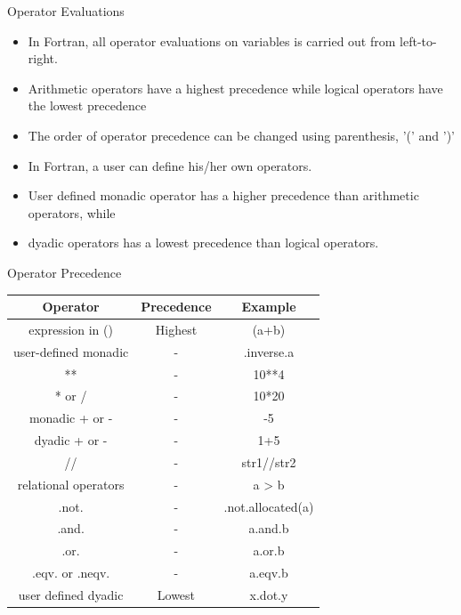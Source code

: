 \documentclass[c,mathserif,compress,xcolor=svgnames]{beamer}
\begin{document}
\begin{frame}[allowframebreaks]{Operator Evaluations}
  \begin{itemize}
    \item In Fortran, all operator evaluations on variables is carried out from left-to-right.
    \item Arithmetic operators have a highest precedence while logical operators have the lowest precedence
    \item The order of operator precedence can be changed using parenthesis, '(' and ')'
    \item In Fortran, a user can define his/her own operators.
    \item User defined monadic operator has a higher precedence than arithmetic operators, while
    \item dyadic operators has a lowest precedence than logical operators.
  \end{itemize}
  \begin{block}{{\scriptsize Operator Precedence}}
    \begin{center}
      {
      \begin{tabular}{ccc}
        Operator & Precedence & Example \\
        \hline
        expression in () & Highest & (a+b) \\
        user-defined monadic & - & .inverse.a \\
        ** & - & 10**4 \\
        * or / & - & 10*20 \\
        monadic + or - & - & -5 \\
        dyadic + or - & - & 1+5 \\
        // & - & str1//str2 \\
        relational operators & - & a > b \\
        .not. & - & .not.allocated(a) \\
        .and. & - & a.and.b \\
        .or. & - & a.or.b \\
        .eqv. or .neqv. & - & a.eqv.b \\
        user defined dyadic & Lowest & x.dot.y\\
        \hline
      \end{tabular}
      }
    \end{center}
  \end{block}
\end{frame}
\end{document}
